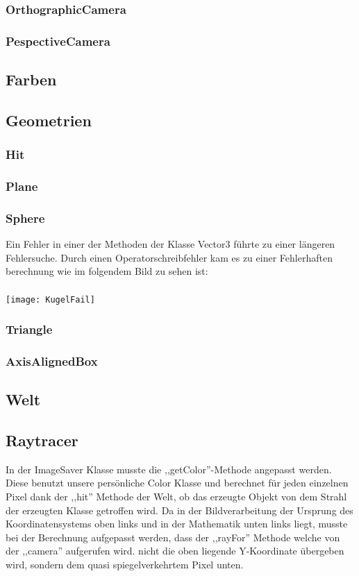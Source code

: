 \documentclass[14pt]{extarticle}
\begin{document}
\subsubsection{OrthographicCamera}
\subsubsection{PespectiveCamera}
\subsection{Farben}
\subsection{Geometrien}
\subsubsection{Hit}
\subsubsection{Plane}
\subsubsection{Sphere}
Ein Fehler in einer der Methoden der Klasse Vector3 führte zu einer längeren Fehlersuche. Durch einen Operatorschreibfehler kam es zu einer Fehlerhaften berechnung wie im folgendem Bild zu sehen ist:\\\\
\texttt{[image: KugelFail]}
\subsubsection{Triangle}
\subsubsection{AxisAlignedBox}

\subsection{Welt}
\subsection{Raytracer}

In der ImageSaver Klasse musste die ,,getColor''-Methode angepasst werden. Diese benutzt unsere persönliche Color Klasse und berechnet für jeden einzelnen Pixel dank der ,,hit'' Methode der Welt, ob das erzeugte Objekt von dem Strahl der erzeugten Klasse getroffen wird. Da in der Bildverarbeitung der Ursprung des Koordinatensystems oben links und in der Mathematik unten links liegt, musste bei der Berechnung aufgepasst werden, dass der ,,rayFor'' Methode welche von der ,,camera'' aufgerufen wird. nicht die oben liegende Y-Koordinate übergeben wird, sondern dem quasi spiegelverkehrtem Pixel unten. 
\end{document}
